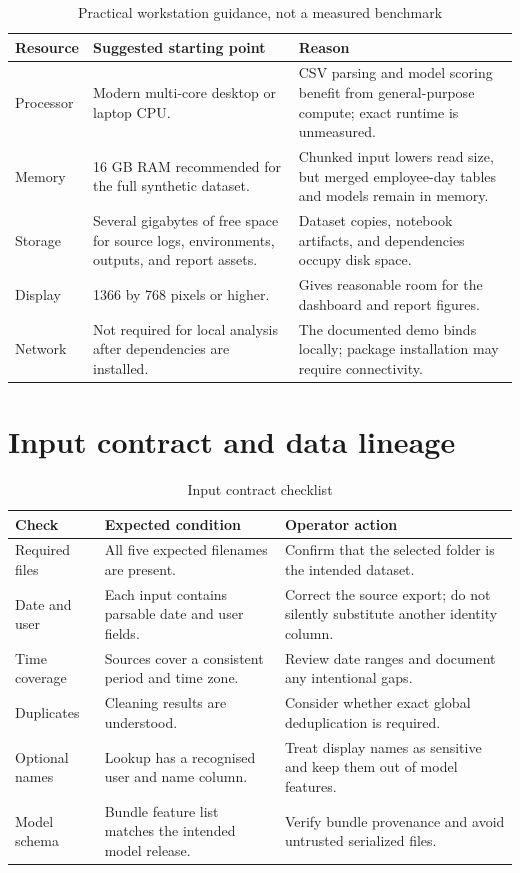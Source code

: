 \documentclass[12pt,a4paper,oneside]{report}
\newcommand{\tablefont}{\small}
\begin{document}
\begin{table}[H]
\centering
\tablefont
\caption{Practical workstation guidance, not a measured benchmark}
\label{tab:hardware-requirements}
\begin{tabularx}{\textwidth}{|p{}|p{}|Y|}
\hline
\textbf{Resource} & \textbf{Suggested starting point} & \textbf{Reason}\\\hline
Processor & Modern multi-core desktop or laptop CPU. & CSV parsing and model scoring benefit from general-purpose compute; exact runtime is unmeasured.\\\hline
Memory & 16 GB RAM recommended for the full synthetic dataset. & Chunked input lowers read size, but merged employee-day tables and models remain in memory.\\\hline
Storage & Several gigabytes of free space for source logs, environments, outputs, and report assets. & Dataset copies, notebook artifacts, and dependencies occupy disk space.\\\hline
Display & 1366 by 768 pixels or higher. & Gives reasonable room for the dashboard and report figures.\\\hline
Network & Not required for local analysis after dependencies are installed. & The documented demo binds locally; package installation may require connectivity.\\\hline
\end{tabularx}
\end{table}

\section{Input contract and data lineage}
\label{app:data-lineage}
\begin{table}[H]
\centering
\tablefont
\caption{Input contract checklist}
\label{tab:input-contract}
\begin{tabularx}{\textwidth}{|p{}|p{}|Y|}
\hline
\textbf{Check} & \textbf{Expected condition} & \textbf{Operator action}\\\hline
Required files & All five expected filenames are present. & Confirm that the selected folder is the intended dataset.\\\hline
Date and user & Each input contains parsable date and user fields. & Correct the source export; do not silently substitute another identity column.\\\hline
Time coverage & Sources cover a consistent period and time zone. & Review date ranges and document any intentional gaps.\\\hline
Duplicates & Cleaning results are understood. & Consider whether exact global deduplication is required.\\\hline
Optional names & Lookup has a recognised user and name column. & Treat display names as sensitive and keep them out of model features.\\\hline
Model schema & Bundle feature list matches the intended model release. & Verify bundle provenance and avoid untrusted serialized files.\\\hline
\end{tabularx}
\end{table}
\end{document}
